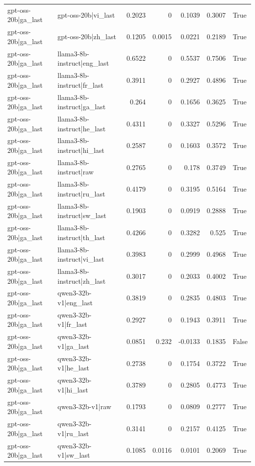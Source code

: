 \begin{table}
\begin{tabular}{l l r r r r l}
gpt-oss-20b|ga_last & gpt-oss-20b|vi_last & 0.2023 & 0 & 0.1039 & 0.3007 & True \\
gpt-oss-20b|ga_last & gpt-oss-20b|zh_last & 0.1205 & 0.0015 & 0.0221 & 0.2189 & True \\
gpt-oss-20b|ga_last & llama3-8b-instruct|eng_last & 0.6522 & 0 & 0.5537 & 0.7506 & True \\
gpt-oss-20b|ga_last & llama3-8b-instruct|fr_last & 0.3911 & 0 & 0.2927 & 0.4896 & True \\
gpt-oss-20b|ga_last & llama3-8b-instruct|ga_last & 0.264 & 0 & 0.1656 & 0.3625 & True \\
gpt-oss-20b|ga_last & llama3-8b-instruct|he_last & 0.4311 & 0 & 0.3327 & 0.5296 & True \\
gpt-oss-20b|ga_last & llama3-8b-instruct|hi_last & 0.2587 & 0 & 0.1603 & 0.3572 & True \\
gpt-oss-20b|ga_last & llama3-8b-instruct|raw & 0.2765 & 0 & 0.178 & 0.3749 & True \\
gpt-oss-20b|ga_last & llama3-8b-instruct|ru_last & 0.4179 & 0 & 0.3195 & 0.5164 & True \\
gpt-oss-20b|ga_last & llama3-8b-instruct|sw_last & 0.1903 & 0 & 0.0919 & 0.2888 & True \\
gpt-oss-20b|ga_last & llama3-8b-instruct|th_last & 0.4266 & 0 & 0.3282 & 0.525 & True \\
gpt-oss-20b|ga_last & llama3-8b-instruct|vi_last & 0.3983 & 0 & 0.2999 & 0.4968 & True \\
gpt-oss-20b|ga_last & llama3-8b-instruct|zh_last & 0.3017 & 0 & 0.2033 & 0.4002 & True \\
gpt-oss-20b|ga_last & qwen3-32b-v1|eng_last & 0.3819 & 0 & 0.2835 & 0.4803 & True \\
gpt-oss-20b|ga_last & qwen3-32b-v1|fr_last & 0.2927 & 0 & 0.1943 & 0.3911 & True \\
gpt-oss-20b|ga_last & qwen3-32b-v1|ga_last & 0.0851 & 0.232 & -0.0133 & 0.1835 & False \\
gpt-oss-20b|ga_last & qwen3-32b-v1|he_last & 0.2738 & 0 & 0.1754 & 0.3722 & True \\
gpt-oss-20b|ga_last & qwen3-32b-v1|hi_last & 0.3789 & 0 & 0.2805 & 0.4773 & True \\
gpt-oss-20b|ga_last & qwen3-32b-v1|raw & 0.1793 & 0 & 0.0809 & 0.2777 & True \\
gpt-oss-20b|ga_last & qwen3-32b-v1|ru_last & 0.3141 & 0 & 0.2157 & 0.4125 & True \\
gpt-oss-20b|ga_last & qwen3-32b-v1|sw_last & 0.1085 & 0.0116 & 0.0101 & 0.2069 & True \\

\end{tabular}
\end{table}
